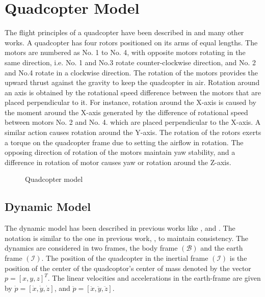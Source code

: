 \documentclass[letterpaper%
, twoside%
, 12pt%
,memoire%
, english%
,creativecommons,hyperref%
]{thETS}
\begin{document}
\chapter{Quadcopter Model} \label{Chap:Quad}
The flight principles of a quadcopter have been described in \citep{RN71} and many other works.
A quadcopter has four rotors positioned on its arms of equal lengths. The motors are numbered as No. 1 to No. 4, with opposite motors rotating in the same direction, i.e. No. 1 and No.3 rotate counter-clockwise direction, and No. 2 and No.4 rotate in a clockwise direction. The rotation of the motors provides the upward thrust against the gravity to keep the quadcopter in air. Rotation around an axis is obtained by the rotational speed difference between the motors that are placed perpendicular to it. For instance, rotation around the X-axis is caused by the moment around the X-axis generated by the difference of rotational speed between motors No. 2 and No. 4. which are placed perpendicular to the X-axis. A similar action causes rotation around the Y-axis. The rotation of the rotors exerts a torque on the quadcopter frame due to setting the airflow in rotation. The opposing direction of rotation of the motors maintain yaw stability, and a difference in rotation of motor causes yaw or rotation around the Z-axis.
\begin{figure}
\centerline{}
\caption{Quadcopter model}
\label{quad_red_balls}
\end{figure}
\section{Dynamic Model}
The dynamic model has been described in previous works like \citep{hoffmann2007quadrotor}, \citep{zheng2014second} and \citep{alexis2012model}. The notation is similar to the one in previous work, \citep{RN114}, to maintain consistency. 
The dynamics are considered in two frames, the body frame $(\mathcal{B})$ and the earth frame $(\mathcal{I})$. The position of the quadcopter in the inertial frame $(\mathcal{I})$ is the position of the center of the quadcoptor's center of mass denoted by the vector $p=[x,y,z]^{T}$. The linear velocities and accelerations in the earth-frame are given by $\dot{p}=[\dot{x},\dot{y},\dot{z}]$, and $\ddot{p}=[\ddot{x},\ddot{y},\ddot{z}]$. 
\end{document}
